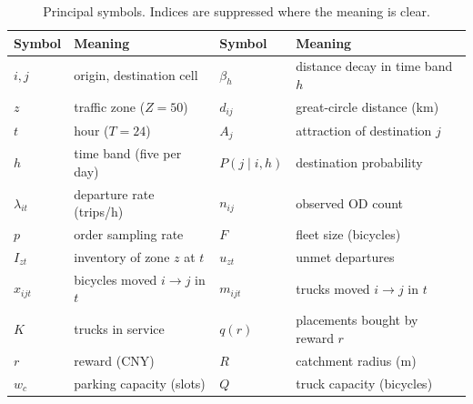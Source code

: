 \begin{table}[htbp]
\centering
\footnotesize
\caption[Principal symbols]{Principal symbols. Indices are suppressed where the meaning is clear.}
\label{tab:notation}
\scriptsize
\begin{tabular}{@{}ll@{\hspace{1.2cm}}ll@{}}
\toprule
\textbf{Symbol} & \textbf{Meaning} & \textbf{Symbol} & \textbf{Meaning} \\
\midrule
$i,j$ & origin, destination cell & $\beta_h$ & distance decay in time band $h$ \\
$z$ & traffic zone ($Z=50$) & $d_{ij}$ & great-circle distance (km) \\
$t$ & hour ($T=24$) & $A_j$ & attraction of destination $j$ \\
$h$ & time band (five per day) & $P(j\mid i,h)$ & destination probability \\
$\lambda_{it}$ & departure rate (trips/h) & $n_{ij}$ & observed OD count \\
$p$ & order sampling rate & $F$ & fleet size (bicycles) \\
$I_{zt}$ & inventory of zone $z$ at $t$ & $u_{zt}$ & unmet departures \\
$x_{ijt}$ & bicycles moved $i\to j$ in $t$ & $m_{ijt}$ & trucks moved $i\to j$ in $t$ \\
$K$ & trucks in service & $q(r)$ & placements bought by reward $r$ \\
$r$ & reward (CNY) & $R$ & catchment radius (m) \\
$w_c$ & parking capacity (slots) & $Q$ & truck capacity (bicycles) \\
\bottomrule
\end{tabular}
\end{table}
